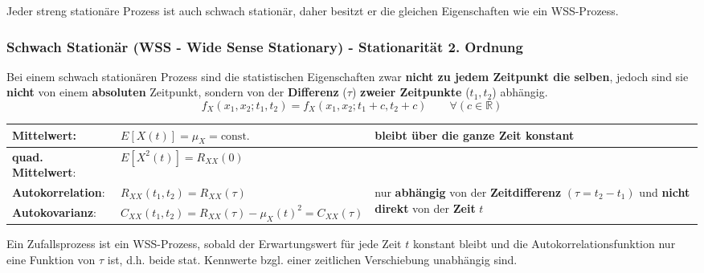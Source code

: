 Jeder streng stationäre Prozess ist auch schwach stationär, daher besitzt er die gleichen Eigenschaften wie ein WSS-Prozess.

\subsubsection{Schwach Stationär (WSS - Wide Sense Stationary) - Stationarität 2. Ordnung}
Bei einem schwach stationären Prozess sind die statistischen Eigenschaften zwar
\textbf{nicht zu jedem Zeitpunkt die selben}, jedoch sind sie \textbf{nicht} von einem \textbf{absoluten} Zeitpunkt, sondern
von der \textbf{Differenz} ($\tau$) \textbf{zweier Zeitpunkte} ($t_1, t_2$) abhängig.  \\ 
\vspace{-0.2cm}
$$ f_X(x_1, x_2; t_1, t_2) = f_X(x_1, x_2; t_1+c, t_2+c) \qquad \forall (c \in \mathbb{R})$$

\renewcommand{\arraystretch}{1.4}
\begin{tabular}[c]{ |p{3.3cm}|  p{6.5cm} |p{8cm}| }
	\hline
	\textbf{Mittelwert}: 	&  $E[X(t)] = \mu_{X} = \text{const.}$  
							& bleibt über die ganze Zeit konstant\\ 
	\hline
	\textbf{quad. Mittelwert}: 	&  $E[X^{2}(t)] = R_{XX}(0)$ &  \\ 
	\hline
	\textbf{Autokorrelation}: 	& 	$R_{XX}(t_{1},t_{2}) = R_{XX}(\tau)$
	& \multirow{2}{8cm}{nur \textbf{abhängig} von der \textbf{Zeitdifferenz} $(\tau = t_2 - t_1)$ und \textbf{nicht direkt} von der \textbf{Zeit} $t$}\\
	 \cline{1-2}
	 \textbf{Autokovarianz}:		& $ C_{XX}(t_{1},t_{2}) = R_{XX}(\tau) - \mu_{X}(t)^{2} = C_{XX}(\tau)$ & \\
	 \hline
\end{tabular}
\renewcommand{\arraystretch}{1}
 
Ein Zufallsprozess ist ein WSS-Prozess, sobald der Erwartungswert
für jede Zeit $t$ konstant bleibt und die Autokorrelationsfunktion nur eine Funktion von $\tau$ ist, d.h. beide stat. Kennwerte bzgl. einer zeitlichen Verschiebung unabhängig sind.    
        

